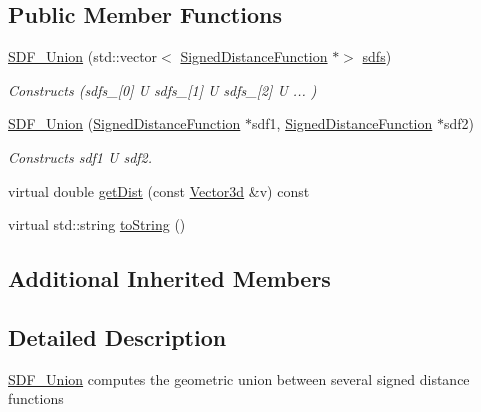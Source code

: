 \subsection*{Public Member Functions}
\begin{DoxyCompactItemize}
\item 
\mbox{\label{classCPlantBox_1_1SDF__Union_a3cfdeaabb1061850a9eaf54c22bb1da6}} 
\hyperlink{classCPlantBox_1_1SDF__Union_a3cfdeaabb1061850a9eaf54c22bb1da6}{S\+D\+F\+\_\+\+Union} (std\+::vector$<$ \hyperlink{classCPlantBox_1_1SignedDistanceFunction}{Signed\+Distance\+Function} $\ast$$>$ \hyperlink{classCPlantBox_1_1SDF__Intersection_ae535a96e22ba7542409a716caf6b3ffc}{sdfs})
\begin{DoxyCompactList}\small\item\em Constructs (sdfs\+\_\+\mbox{[}0\mbox{]} U sdfs\+\_\+\mbox{[}1\mbox{]} U sdfs\+\_\+\mbox{[}2\mbox{]} U ... ) \end{DoxyCompactList}\item 
\mbox{\label{classCPlantBox_1_1SDF__Union_aa730dbbc821725a87725afc177d6c98a}} 
\hyperlink{classCPlantBox_1_1SDF__Union_aa730dbbc821725a87725afc177d6c98a}{S\+D\+F\+\_\+\+Union} (\hyperlink{classCPlantBox_1_1SignedDistanceFunction}{Signed\+Distance\+Function} $\ast$sdf1, \hyperlink{classCPlantBox_1_1SignedDistanceFunction}{Signed\+Distance\+Function} $\ast$sdf2)
\begin{DoxyCompactList}\small\item\em Constructs sdf1 U sdf2. \end{DoxyCompactList}\item 
virtual double \hyperlink{classCPlantBox_1_1SDF__Union_a8da2dd137f1676b7bd66cdcc9c8bef00}{get\+Dist} (const \hyperlink{classCPlantBox_1_1Vector3d}{Vector3d} \&v) const
\item 
virtual std\+::string \hyperlink{classCPlantBox_1_1SDF__Union_ae73d167fbe4edc64b4f41d2e820a0517}{to\+String} ()
\end{DoxyCompactItemize}
\subsection*{Additional Inherited Members}


\subsection{Detailed Description}
\hyperlink{classCPlantBox_1_1SDF__Union}{S\+D\+F\+\_\+\+Union} computes the geometric union between several signed distance functions 

